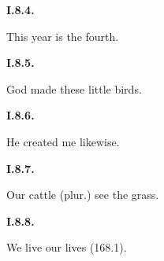 \par\begin{minipage}{\linewidth}\raggedright
\textbf{I.8.4.}

This year is the fourth.

\end{minipage}\par\addvspace{4pt}

\par\begin{minipage}{\linewidth}\raggedright
\textbf{I.8.5.}

God made these little birds.

\end{minipage}\par\addvspace{4pt}

\par\begin{minipage}{\linewidth}\raggedright
\textbf{I.8.6.}

He created me likewise.

\end{minipage}\par\addvspace{4pt}

\par\begin{minipage}{\linewidth}\raggedright
\textbf{I.8.7.}

Our cattle (plur.) see the grass.

\end{minipage}\par\addvspace{4pt}

\par\begin{minipage}{\linewidth}\raggedright
\textbf{I.8.8.}

We live our lives (168.1).

\end{minipage}\par\addvspace{4pt}

